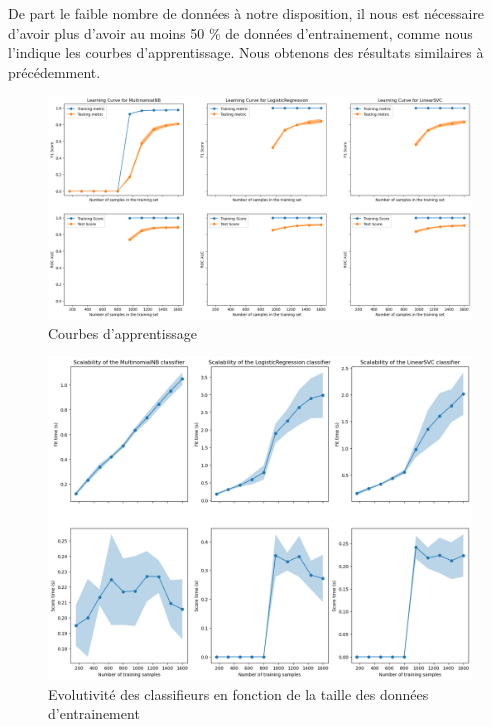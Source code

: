 \documentclass{article}
\begin{document}
De part le faible nombre de données à notre disposition, il nous est nécessaire d'avoir plus d'avoir au moins 50 \% de données d'entrainement, comme nous l'indique les courbes d'apprentissage. Nous obtenons des résultats similaires à précédemment. 

\begin{figure}[H]
    \centering
    \includegraphics[width=\textwidth]{./src/movies/learningcurve.png} 
    \caption{Courbes d'apprentissage}
    \label{learningcurve_movies}
\end{figure}

\begin{figure}[H]
    \centering
    \includegraphics[width=\textwidth]{./src/movies/complexity_analysis_nsamples.png} 
    \caption{Evolutivité des classifieurs en fonction de la taille des données d'entrainement}
    \label{complexity_analysis_nsamples_movies}
\end{figure}
\end{document}
